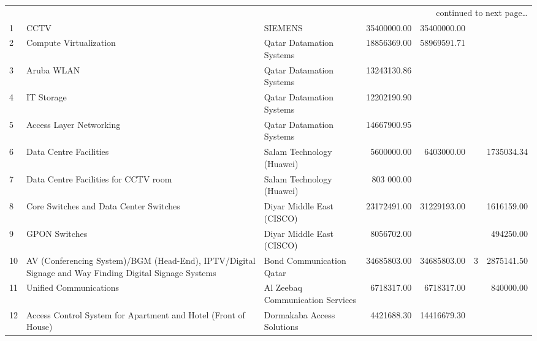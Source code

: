 \begin{longtable}[c]{|l|%
                  >{\RaggedRight}p{3.5cm}|%
                  >{\RaggedRight}p{3.5cm}|%
                  r|r %
                  |c|r|}
\endhead
\multicolumn{7}{r}{continued to next page\ldots}\\
\endfoot
\endlastfoot
\rowcolor{thetableheadbgcolor!0.25!white} 1  & CCTV   & SIEMENS   & \num{35400000.00}   & \num{35400000.00}   &    &    \\
\hline
\rowcolor{thetableheadbgcolor!0.25!white} 2  & Compute Virtualization   & Qatar Datamation Systems   & \num{18856369.00}   & \num{58969591.71}   &    &    \\
\rowcolor{thetableheadbgcolor!0.25!white} 3  & Aruba WLAN   & Qatar Datamation Systems   & \num{13243130.86}   &    &    &    \\
\rowcolor{thetableheadbgcolor!0.25!white} 4  & IT Storage   & Qatar Datamation Systems   & \num{12202190.90}   &    &    &    \\
\rowcolor{thetableheadbgcolor!0.25!white} 5  & Access Layer Networking   & Qatar Datamation Systems   & \num{14667900.95}   &    &    &    \\
\hline
\rowcolor{thetableheadbgcolor!0.25!white} 6  & Data Centre Facilities   & Salam Technology (Huawei)   & \num{5600000.00}   & \num{6403000.00}   &    & \num{1735034.34}   \\
\rowcolor{thetableheadbgcolor!0.25!white} 7  & Data Centre Facilities for CCTV room   & Salam Technology (Huawei)   & 803 000.00   &    &    &    \\
\hline
\rowcolor{thetableheadbgcolor!0.25!white} 8  & Core Switches and Data Center Switches   & Diyar Middle East (CISCO)   & \num{23172491.00}   & \num{31229193.00}   &    & \num{1616159.00}   \\
\rowcolor{thetableheadbgcolor!0.25!white} 9  & GPON Switches   & Diyar Middle East (CISCO)   & \num{8056702.00}   &    &    & \num{494250.00}   \\
\hline
\rowcolor{thetableheadbgcolor!0.25!white} 10  & AV (Conferencing System)/BGM (Head-End), IPTV/Digital Signage and Way Finding Digital Signage Systems   & Bond Communication Qatar   & \num{34685803.00}   & \num{34685803.00}   & \num{3}   & \num{2875141.50}   \\
\hline
\rowcolor{thetableheadbgcolor!0.25!white} 11  & Unified Communications   & Al Zeebaq Communication Services   & \num{6718317.00}   & \num{6718317.00}   &    & \num{840000.00}   \\
\hline
\rowcolor{thetableheadbgcolor!0.25!white} 12  & Access Control System for Apartment and Hotel (Front of House)   & Dormakaba Access Solutions   & \num{4421688.30}   & \num{14416679.30}   &    &    \\

\end{longtable}
